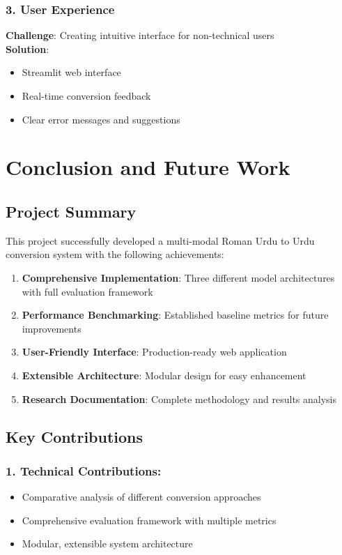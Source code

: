 \documentclass[10pt,twocolumn]{article}
\begin{document}
\subsubsection*{3. User Experience}
\textbf{Challenge}: Creating intuitive interface for non-technical users\\
\textbf{Solution}:
\begin{itemize}[leftmargin=*,noitemsep,topsep=0pt,parsep=0pt,partopsep=0pt]
    \item Streamlit web interface
    \item Real-time conversion feedback
    \item Clear error messages and suggestions
\end{itemize}

\section{Conclusion and Future Work}

\subsection{Project Summary}
This project successfully developed a multi-modal Roman Urdu to Urdu conversion system with the following achievements:
\begin{enumerate}[label=\arabic*.]
    \item \textbf{Comprehensive Implementation}: Three different model architectures with full evaluation framework
    \item \textbf{Performance Benchmarking}: Established baseline metrics for future improvements
    \item \textbf{User-Friendly Interface}: Production-ready web application
    \item \textbf{Extensible Architecture}: Modular design for easy enhancement
    \item \textbf{Research Documentation}: Complete methodology and results analysis
\end{enumerate}

\subsection{Key Contributions}
\subsubsection*{1. Technical Contributions:}
\begin{itemize}[leftmargin=*,noitemsep,topsep=0pt,parsep=0pt,partopsep=0pt]
    \item Comparative analysis of different conversion approaches
    \item Comprehensive evaluation framework with multiple metrics
    \item Modular, extensible system architecture
\end{itemize}
\end{document}
